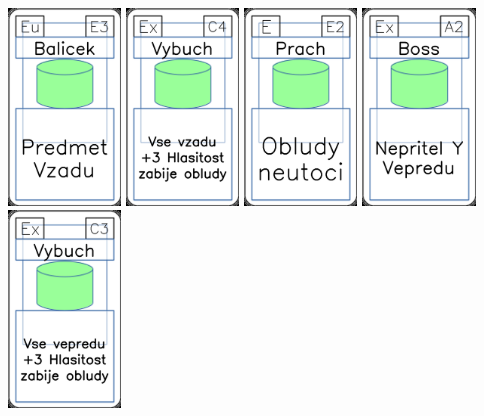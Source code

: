 \documentclass[a4paper]{article}
\begin{document}
	\includegraphics[width=3.0cm]{img-4_22}
	\includegraphics[width=3.0cm]{img-4_13}
	\includegraphics[width=3.0cm]{img-4_51}
	\includegraphics[width=3.0cm]{img-4_1}
	\includegraphics[width=3.0cm]{img-4_12}
\end{document}
